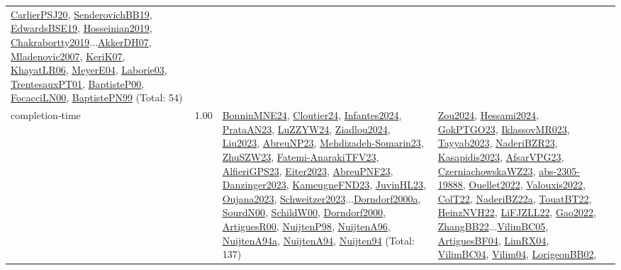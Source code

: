 {\begin{longtable}{p{3cm}r>{\raggedright\arraybackslash}p{6cm}>{\raggedright\arraybackslash}p{6cm}>{\raggedright\arraybackslash}p{8cm}}
\hyperref[detail:CarlierPSJ20]{CarlierPSJ20}, \hyperref[detail:SenderovichBB19]{SenderovichBB19}, \hyperref[detail:EdwardsBSE19]{EdwardsBSE19}, \hyperref[detail:Hosseinian2019]{Hosseinian2019}, \hyperref[detail:Chakrabortty2019]{Chakrabortty2019}...\hyperref[detail:AkkerDH07]{AkkerDH07}, \hyperref[detail:Mladenovic2007]{Mladenovic2007}, \hyperref[detail:KeriK07]{KeriK07}, \hyperref[detail:KhayatLR06]{KhayatLR06}, \hyperref[detail:MeyerE04]{MeyerE04}, \hyperref[detail:Laborie03]{Laborie03}, \hyperref[detail:TrentesauxPT01]{TrentesauxPT01}, \hyperref[detail:BaptisteP00]{BaptisteP00}, \hyperref[detail:FocacciLN00]{FocacciLN00}, \hyperref[detail:BaptistePN99]{BaptistePN99} (Total: 54)\\
\index{completion-time}\index{Concepts!completion-time}completion-time &  1.00 & \hyperref[detail:BonninMNE24]{BonninMNE24}, \hyperref[detail:Cloutier24]{Cloutier24}, \hyperref[detail:Infantes2024]{Infantes2024}, \hyperref[detail:PrataAN23]{PrataAN23}, \hyperref[detail:LuZZYW24]{LuZZYW24}, \hyperref[detail:Ziadlou2024]{Ziadlou2024}, \hyperref[detail:Liu2023]{Liu2023}, \hyperref[detail:AbreuNP23]{AbreuNP23}, \hyperref[detail:Mehdizadeh-Somarin23]{Mehdizadeh-Somarin23}, \hyperref[detail:ZhuSZW23]{ZhuSZW23}, \hyperref[detail:Fatemi-AnarakiTFV23]{Fatemi-AnarakiTFV23}, \hyperref[detail:AlfieriGPS23]{AlfieriGPS23}, \hyperref[detail:Eiter2023]{Eiter2023}, \hyperref[detail:AbreuPNF23]{AbreuPNF23}, \hyperref[detail:Danzinger2023]{Danzinger2023}, \hyperref[detail:KameugneFND23]{KameugneFND23}, \hyperref[detail:JuvinHL23]{JuvinHL23}, \hyperref[detail:Oujana2023]{Oujana2023}, \hyperref[detail:Schweitzer2023]{Schweitzer2023}...\hyperref[detail:Dorndorf2000a]{Dorndorf2000a}, \hyperref[detail:SourdN00]{SourdN00}, \hyperref[detail:SchildW00]{SchildW00}, \hyperref[detail:Dorndorf2000]{Dorndorf2000}, \hyperref[detail:ArtiguesR00]{ArtiguesR00}, \hyperref[detail:NuijtenP98]{NuijtenP98}, \hyperref[detail:NuijtenA96]{NuijtenA96}, \hyperref[detail:NuijtenA94a]{NuijtenA94a}, \hyperref[detail:NuijtenA94]{NuijtenA94}, \hyperref[detail:Nuijten94]{Nuijten94} (Total: 137) & \hyperref[detail:Zou2024]{Zou2024}, \hyperref[detail:Hessami2024]{Hessami2024}, \hyperref[detail:GokPTGO23]{GokPTGO23}, \hyperref[detail:IklassovMR023]{IklassovMR023}, \hyperref[detail:Tayyab2023]{Tayyab2023}, \hyperref[detail:NaderiBZR23]{NaderiBZR23}, \hyperref[detail:Kasapidis2023]{Kasapidis2023}, \hyperref[detail:AfsarVPG23]{AfsarVPG23}, \hyperref[detail:CzerniachowskaWZ23]{CzerniachowskaWZ23}, \hyperref[detail:abs-2305-19888]{abs-2305-19888}, \hyperref[detail:Ouellet2022]{Ouellet2022}, \hyperref[detail:Valouxis2022]{Valouxis2022}, \hyperref[detail:ColT22]{ColT22}, \hyperref[detail:NaderiBZ22a]{NaderiBZ22a}, \hyperref[detail:TouatBT22]{TouatBT22}, \hyperref[detail:HeinzNVH22]{HeinzNVH22}, \hyperref[detail:LiFJZLL22]{LiFJZLL22}, \hyperref[detail:Gao2022]{Gao2022}, \hyperref[detail:ZhangBB22]{ZhangBB22}...\hyperref[detail:VilimBC05]{VilimBC05}, \hyperref[detail:ArtiguesBF04]{ArtiguesBF04}, \hyperref[detail:LimRX04]{LimRX04}, \hyperref[detail:VilimBC04]{VilimBC04}, \hyperref[detail:Vilim04]{Vilim04}, \hyperref[detail:LorigeonBB02]{LorigeonBB02}, 
\end{longtable}}
